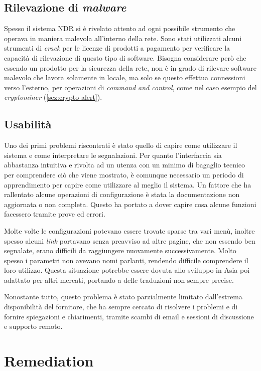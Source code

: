 \subsection{Rilevazione di \emph{malware}}

Spesso il sistema NDR si è rivelato attento ad ogni possibile strumento che operava in maniera malevola all'interno della rete. Sono stati utilizzati alcuni strumenti di \emph{crack} per le licenze di prodotti a pagamento per verificare la capacità di rilevazione di questo tipo di software. Bisogna considerare però che essendo un prodotto per la sicurezza della rete, non è in grado di rilevare software malevolo che lavora solamente in locale, ma solo se questo effettua connessioni verso l'esterno, per operazioni di \emph{command and control}, come nel caso esempio del \emph{cryptominer} (\autoref{sez:crypto-alert}).

\subsection{Usabilità}

Uno dei primi problemi riscontrati è stato quello di capire come utilizzare il sistema e come interpretare le segnalazioni. Per quanto l'interfaccia sia abbastanza intuitiva e rivolta ad un utenza con un minimo di bagaglio tecnico per comprendere ciò che viene mostrato, è comunque necessario un periodo di apprendimento per capire come utilizzare al meglio il sistema. Un fattore che ha rallentato alcune operazioni di configurazione è stata la documentazione non aggiornata o non completa. Questo ha portato a dover capire cosa alcune funzioni facessero tramite prove ed errori.

Molte volte le configurazioni potevano essere trovate sparse tra vari menù, inoltre spesso alcuni \emph{link} portavano senza preavviso ad altre pagine, che non essendo ben segnalate, erano difficili da raggiungere nuovamente successivamente. Molto spesso i parametri non avevano nomi parlanti, rendendo difficile comprendere il loro utilizzo. Questa situazione potrebbe essere dovuta allo sviluppo in Asia poi adattato per altri mercati, portando a delle traduzioni non sempre precise.

Nonostante tutto, questo problema è stato parzialmente limitato dall'estrema disponibilità del fornitore, che ha sempre cercato di risolvere i problemi e di fornire spiegazioni e chiarimenti, tramite scambi di email e sessioni di discussione e supporto remoto.

\section{Remediation}
\label{sec:remediation}

